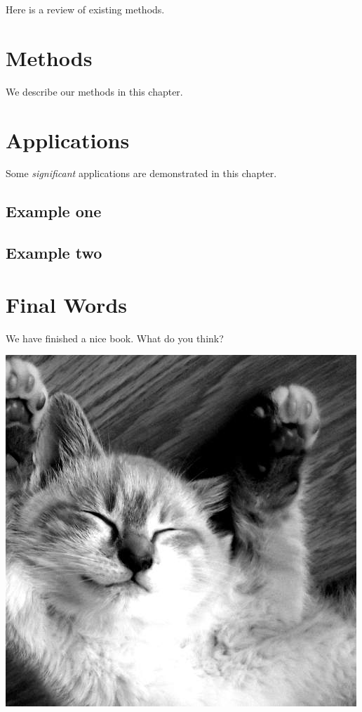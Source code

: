 \documentclass[
]{book}
\begin{document}
Here is a review of existing methods.

\hypertarget{methods}{%
\chapter{Methods}\label{methods}}

We describe our methods in this chapter.

\hypertarget{applications}{%
\chapter{Applications}\label{applications}}

Some \emph{significant} applications are demonstrated in this chapter.

\hypertarget{example-one}{%
\section{Example one}\label{example-one}}

\hypertarget{example-two}{%
\section{Example two}\label{example-two}}

\hypertarget{final-words}{%
\chapter{Final Words}\label{final-words}}

We have finished a nice book. What do you think?

\includegraphics{images/500.jpg}
\end{document}
